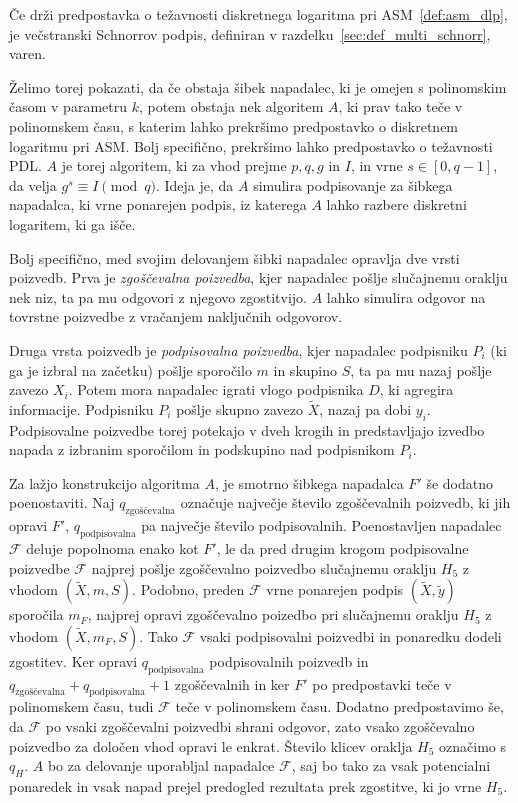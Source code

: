\documentclass[isrm2, tisk]{fmfdelo}
\begin{document}
\begin{izrek}
    Če drži predpostavka o težavnosti diskretnega logaritma pri ASM~\ref{def:asm_dlp}, je večstranski 
    Schnorrov podpis, definiran v razdelku~\ref{sec:def_multi_schnorr}, varen.
\end{izrek}

Želimo torej pokazati, da če obstaja šibek napadalec, ki je omejen s polinomskim časom v parametru
$k$, potem obstaja nek algoritem $A$, ki prav tako teče v polinomskem času, s katerim lahko prekršimo
predpostavko o diskretnem logaritmu pri ASM. Bolj specifično, prekršimo lahko predpostavko o
težavnosti PDL. $A$ je torej algoritem, ki za vhod prejme $p, q, g$ in $I$, in vrne $s \in [0, q - 1]$,
da velja $g^s \equiv I \pmod q$. Ideja je, da $A$ simulira podpisovanje za šibkega napadalca,
ki vrne ponarejen podpis, iz katerega $A$ lahko razbere diskretni logaritem, ki ga išče.

Bolj specifično, med svojim delovanjem šibki napadalec opravlja dve vrsti poizvedb. Prva je
\textit{zgoščevalna poizvedba}, kjer napadalec pošlje slučajnemu oraklju nek niz, ta pa mu odgovori
z njegovo zgostitvijo. $A$ lahko simulira odgovor na tovrstne poizvedbe z vračanjem naključnih odgovorov.

Druga vrsta poizvedb je \textit{podpisovalna poizvedba}, kjer napadalec podpisniku $P_i$ (ki ga je 
izbral na začetku) pošlje sporočilo $m$ in skupino $S$, ta pa mu nazaj pošlje zavezo $X_i$. Potem
mora napadalec igrati vlogo podpisnika $D$, ki agregira informacije. Podpisniku $P_i$ pošlje skupno
zavezo $\tilde{X}$, nazaj pa dobi $y_i$. Podpisovalne poizvedbe torej potekajo v dveh krogih in
predstavljajo izvedbo napada z izbranim sporočilom in podskupino nad podpisnikom $P_i$.

Za lažjo konstrukcijo algoritma $A$, je smotrno šibkega napadalca $F'$ še dodatno poenostaviti. Naj
$q_{\text{zgoščevalna}}$ označuje največje število zgoščevalnih poizvedb, ki jih opravi $F'$,
$q_{\text{podpisovalna}}$ pa največje število podpisovalnih. Poenostavljen napadalec $\mathcal{F}$
deluje popolnoma enako kot $F'$, le da pred drugim krogom podpisovalne poizvedbe $\mathcal{F}$
najprej pošlje zgoščevalno poizvedbo slučajnemu oraklju $H_5$ z vhodom $(\tilde{X}, m, S)$. Podobno,
preden $\mathcal{F}$ vrne ponarejen podpis $(\tilde{X}, \tilde{y})$ sporočila $m_F$, najprej opravi
zgoščevalno poizedbo pri slučajnemu oraklju $H_5$ z vhodom $(\tilde{X}, m_F, S)$. Tako $\mathcal{F}$
vsaki podpisovalni poizvedbi in ponaredku dodeli zgostitev. Ker opravi $q_{\text{podpisovalna}}$
podpisovalnih poizvedb in $q_{\text{zgoščevalna}} + q_{\text{podpisovalna}} + 1$ zgoščevalnih in
ker $F'$ po predpostavki teče v polinomskem času, tudi $\mathcal{F}$ teče v polinomskem času.
Dodatno predpostavimo še, da $\mathcal{F}$ po vsaki zgoščevalni poizvedbi shrani odgovor, zato vsako
zgoščevalno poizvedbo za določen vhod opravi le enkrat. Število klicev oraklja $H_5$ označimo s $q_H$.
$A$ bo za delovanje uporabljal napadalce $\mathcal{F}$, saj bo tako za vsak potencialni ponaredek in
vsak napad prejel predogled rezultata prek zgostitve, ki jo vrne $H_5$.
\end{document}
